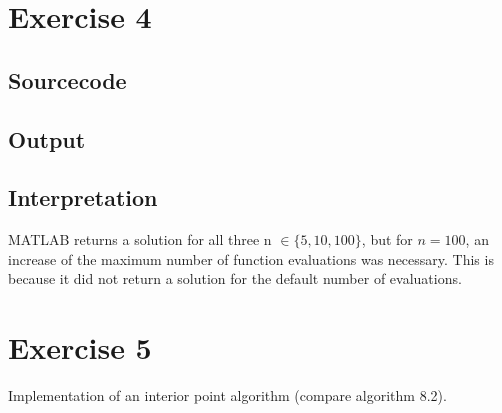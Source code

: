 \documentclass{article}
\begin{document}
	\section{Exercise 4}
	\subsection{Sourcecode}
	
	\subsection{Output}
	
	\subsection{Interpretation}
	MATLAB returns a solution for all three n $\in \{5,10,100\}$, but for $n = 100$, an increase of the maximum number of function evaluations was necessary. This is because it did not return a solution for the default number of evaluations.
	
\section{Exercise 5}
Implementation of an interior point algorithm (compare algorithm 8.2).
\end{document}

